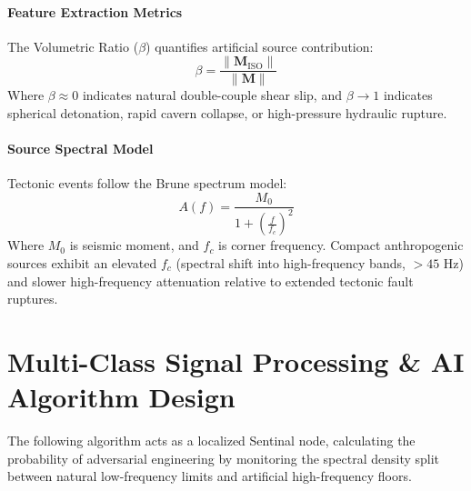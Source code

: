 \documentclass[11pt,a4paper]{article}
\begin{document}
\paragraph{Feature Extraction Metrics}
The Volumetric Ratio ($\beta$) quantifies artificial source contribution:
\begin{equation}
\beta = \frac{\|\mathbf{M}_{\text{ISO}}\|}{\|\mathbf{M}\|}
\end{equation}
Where $\beta \approx 0$ indicates natural double-couple shear slip, and $\beta \to 1$ indicates spherical detonation, rapid cavern collapse, or high-pressure hydraulic rupture.

\paragraph{Source Spectral Model}
Tectonic events follow the Brune spectrum model:
\begin{equation}
A(f) = \frac{M_0}{1 + \left(\frac{f}{f_c}\right)^2}
\end{equation}
Where $M_0$ is seismic moment, and $f_c$ is corner frequency. Compact anthropogenic sources exhibit an elevated $f_c$ (spectral shift into high-frequency bands, $>45\text{ Hz}$) and slower high-frequency attenuation relative to extended tectonic fault ruptures.

\section{Multi-Class Signal Processing \& AI Algorithm Design}
The following algorithm acts as a localized Sentinal node, calculating the probability of adversarial engineering by monitoring the spectral density split between natural low-frequency limits and artificial high-frequency floors.
\end{document}
